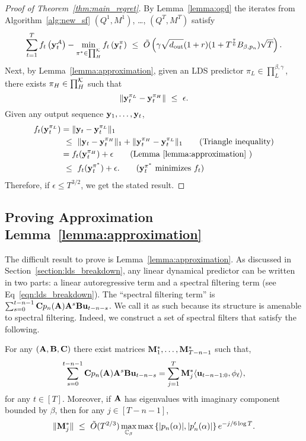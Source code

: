 \begin{proof}[Proof of Theorem~\ref{thm:main_regret}]
    By Lemma~\ref{lemma:ogd} the iterates from Algorithm~\ref{alg:new_sf} $(Q^1, M^1)$, \dots, $(Q^T, M^T)$ satisfy
    \begin{equation*}
    \sum_{t = 1}^T f_t\left( \mathbf{y}_t^{{\mathcal A}}\right) - \min_{\pi^* \in \prod_{H}^{\mathcal{K}}} f_t \left( \mathbf{y}_t^{\pi}\right)  ~\le~ \tilde{O} \left(\gamma \sqrt{d_{\textrm{out}}} (1 + r) (1 + T^{ \frac{7}{6}} B_{\beta, p_n}) \sqrt{T}\right).
\end{equation*}
Next, by Lemma~\ref{lemma:approximation}, given an LDS predictor $\pi_L \in \prod_L^{\beta, \gamma}$, there exists $\pi_H \in \prod_{H}^{\mathcal{K}}$ such that 
\begin{equation}
        \| \mathbf{y}^{\pi_L}_t - \mathbf{y}^{\pi_H}_t \| ~\le~ \epsilon. 
\end{equation}
Given any output sequence $\mathbf{y}_1, \dots, \mathbf{y}_t$, 
\begin{align*}
    f_t(\y^{\pi_L}_t) & = \norm{ \y_t - \y^{\pi_L}_t }_1 \\
    & \leq \norm{ \y_t - \y_t^{\pi_H} }_1 + \norm{ \y^{\pi_H}_t- \y^{\pi_L}_t}_1 \tag{Triangle inequality}\\
    & = f_t(\y_t^{\pi_H} ) + \epsilon \tag{Lemma~\ref{lemma:approximation} }\\
    & \leq f_t(\y_t^{\pi^*}) + \epsilon. \tag{$\y_t^{\pi^*}$ minimizes $f_t$}
\end{align*}
Therefore, if $\epsilon\leq T^{3/2}$, we get the stated result. 
\end{proof}

\subsection{Proving Approximation Lemma~\ref{lemma:approximation}}
The difficult result to prove is Lemma~\ref{lemma:approximation}. As discussed in Section~\ref{section:lds_breakdown}, any linear dynamical predictor can be written in two parts: a linear autoregressive term and a spectral filtering term (see Eq~\eqref{eqn:lds_breakdown}). The ``spectral filtering term'' is $\sum_{s = 0}^{t-n-1} \mathbf{C} p_n(\mathbf{A}) \mathbf{A}^s \mathbf{B} \mathbf u_{t-n-s}$. We call it as such because its structure is amenable to spectral filtering. Indeed, we construct a set of spectral filters that satisfy the following.
\begin{lemma}
\label{lemma:M_matrices}
For any $(\mathbf{A}, \mathbf{B}, \mathbf{C})$ there exist matrices $\mathbf{M}_1^*, \dots, \mathbf{M}^*_{T-n-1}$ such that, 
    \begin{equation}
        \sum_{s = 0}^{t-n-1}  \mathbf{C} p_n(\mathbf{A}) \mathbf{A}^s \mathbf{B} \mathbf u_{t-n-s} = \sum_{j = 1}^{T} \mathbf{M}^*_{j} \langle \mathbf u_{t-n-1:0}, \phi_{\ell} \rangle,
    \end{equation}
    for any $t \in [T]$.
    Moreover, if $\mathbf{A}$ has eigenvalues with imaginary component bounded by $\beta$, then for any $j \in [T-n-1]$,
    \begin{equation*}
        \|\mathbf{M}^*_j\| ~\le~ \tilde{O}(T^{2/3}) \max_{\mathbb{C}_{\beta}} \max \left \{ |p_n(\alpha)|, |p_n'(\alpha)| \right \} e^{-j/6 \log T}.
    \end{equation*}
\end{lemma}

